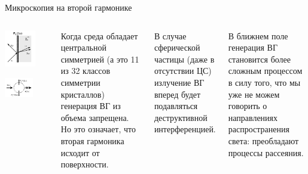 \documentclass[9pt, compress, xcolor=table]{beamer}
\begin{document}
\begin{frame}{Микроскопия на второй гармонике}
\begin{columns}[c]
\column{6.5cm}
\begin{center}
\includegraphics[width=0.7\textwidth]{shg1}

\includegraphics[width=0.65\textwidth]{shg2}
\end{center}
 
\column{6cm}
\vfill Когда среда обладает центральной симметрией (а это 11 из 32 классов симметрии кристаллов) генерация ВГ из объема запрещена. Но это означает, что вторая гармоника исходит от поверхности.
 
\hfill \break В случае сферической частицы (даже в отсутствии ЦС) излучение ВГ вперед будет подавляться деструктивной интерференцией.
 
\hfill \break В ближнем поле генерация ВГ становится более сложным процессом в силу того, что мы уже не можем говорить о направлениях распространения света: преобладают процессы рассеяния. 
\end{columns}
\end{frame}
\end{document}
